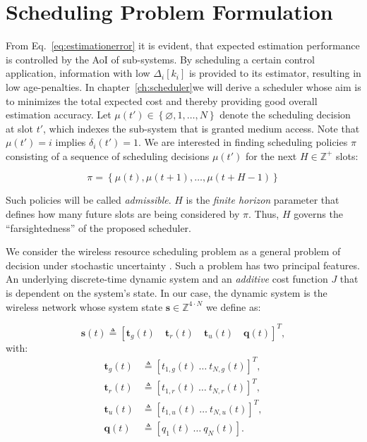\section{Scheduling Problem Formulation} \label{sec:problem} 

From Eq.~\eqref{eq:estimationerror} it is evident, that expected estimation
performance is controlled by the AoI of sub-systems. By scheduling a certain
control application, information with low $\Delta_i[k_i]$ is provided to its
estimator, resulting in low age-penalties. In chapter~\ref{ch:scheduler}we will
derive a scheduler whose aim is to minimizes the total expected cost and thereby
providing good overall estimation accuracy. Let $\mu(t')\in\left\{\varnothing,
1, \dots,N \right\}$ denote the scheduling decision at slot $t'$, which indexes
the sub-system that is granted medium access. Note that $\mu(t')=i$ implies
$\delta_i(t')=1$. We are interested in finding scheduling policies $\pi$
consisting of a sequence of scheduling decisions $\mu(t')$ for the next $H \in
\mathbb{Z}^+$ slots:

\begin{equation}
  \pi=\left\{ \mu(t), \mu(t+1), \dots, \mu(t+H-1) \right\}
\end{equation}

Such policies will be called \textit{admissible}. $H$ is the \textit{finite
horizon} parameter that defines how many future slots are being considered by
$\pi$. Thus, $H$ governs the ``farsightedness'' of the proposed scheduler.

We consider the wireless resource scheduling problem as a general problem of
decision under stochastic uncertainty \cite{bertsekas1995dynamic}. Such a
problem has two principal features. An underlying discrete-time dynamic system
and an \textit{additive} cost function $J$ that is dependent on the system's
state. In our case, the dynamic system is the wireless network whose system
state $\boldsymbol{s} \in \mathbb{Z}^{4\cdot N}$ we define as:

\begin{equation}
  \boldsymbol{s}(t) \triangleq \left[\boldsymbol{t}_g(t) \quad \boldsymbol{t}_r(t) \quad \boldsymbol{t}_u(t) \quad \boldsymbol{q}(t)\right]^T, 
\end{equation}   
with: 
\begin{align}
  \boldsymbol{t}_g(t) &\triangleq \left[ t_{1,g}(t) ~ \dots ~ t_{N,g}(t) \right]^T ,\\
  \boldsymbol{t}_r(t) &\triangleq \left[ t_{1,r}(t) ~ \dots ~ t_{N,r}(t) \right]^T ,\\
  \boldsymbol{t}_u(t) &\triangleq \left[ t_{1,u}(t) ~ \dots ~ t_{N,u}(t) \right]^T ,\\
  \boldsymbol{q}(t) &\triangleq \left[ q_1(t) ~ \dots ~ q_N(t) \right].
\end{align}  

